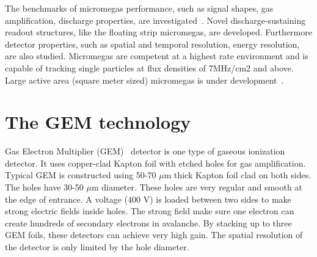 The benchmarks of micromegas performance, such as signal shapes, gas amplification, discharge properties, are investigated~\cite{pub:mgs}.
Novel discharge-sustaining readout structures, like the floating strip micromegas, are developed.
Furthermore detector properties, such as spatial and temporal resolution, energy resolution, are also studied.
Micromegas are competent at a highest rate environment and is capable of tracking single particles
at flux densities of 7MHz/cm2 and above. Large active area (square meter sized) micromegas is under development~\cite{pub:atlas_upgrad}.

\section{The GEM technology}
\label{section:Muon-gem}
Gas Electron Multiplier (GEM)~\cite{pub:gem} detector is one type of gaseous ionization detector.
It uses copper-clad Kapton foil with etched holes for gas amplification.
Typical GEM is constructed using 50-70 $\mu$m thick Kapton foil clad on both sides. The holes have 30-50 $\mu$m diameter.
These holes are very regular and smooth at the edge of entrance.
A voltage (400 V) is loaded between two sides to make strong electric fields inside holes.
The strong field make sure one electron can create hundreds of secondary electrons in avalanche.
By stacking up to three GEM foils, these detectors can achieve very high gain.
The spatial resolution of the detector is only limited by the hole diameter.




